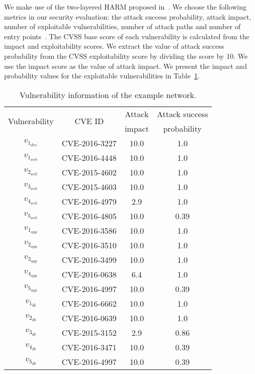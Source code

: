 \documentclass[conference]{IEEEtran}
\begin{document}
We make use of the two-layered HARM proposed in~\cite{Hong2016JNCA}. We choose the following metrics in our security evaluation: the attack success probability, attack impact, number of exploitable vulnerabilities, number of attack paths and number of entry points~\cite{Pendleton2016ComSur}. The CVSS base score of each vulnerability is calculated from the impact and exploitability scores. We extract the value of attack success probability from the CVSS exploitability score by dividing the score by 10. We use the impact score as the value of attack impact. We present the impact and probability values for the exploitable vulnerabilities in Table~\ref{tb_vuls_cve}.
\begin{table}[htb] \small
\caption{Vulnerability information of the example network.}
\label{tb_vuls_cve}
\centering
\begin{tabular}{|c|c|c|c|}
\hline
\multirow{2}{*}{Vulnerability} & \multirow{2}{*}{CVE ID} & Attack & Attack success\\
&&impact&probability\\
\hline
$v_{1_{\mathit{dns}}}$ & CVE-2016-3227 & 10.0 & 1.0 \\
\hline
$v_{1_{\mathit{web}}}$ & CVE-2016-4448 & 10.0 & 1.0\\
\hline
$v_{2_{\mathit{web}}}$ & CVE-2015-4602 & 10.0 & 1.0\\
\hline
$v_{3_{\mathit{web}}}$ & CVE-2015-4603 & 10.0 & 1.0\\
\hline
$v_{4_{\mathit{web}}}$ & CVE-2016-4979 & 2.9 & 1.0\\
\hline
$v_{5_{\mathit{web}}}$ & CVE-2016-4805 & 10.0 & 0.39\\
\hline
$v_{1_{\mathit{app}}}$ & CVE-2016-3586 & 10.0 & 1.0\\
\hline
$v_{2_{\mathit{app}}}$ & CVE-2016-3510 & 10.0 & 1.0\\
\hline
$v_{3_{\mathit{app}}}$ & CVE-2016-3499 & 10.0 & 1.0\\
\hline
$v_{4_{\mathit{app}}}$ & CVE-2016-0638 & 6.4 & 1.0\\
\hline
$v_{5_{\mathit{app}}}$ & CVE-2016-4997 & 10.0 & 0.39\\
\hline
$v_{1_{\mathit{db}}}$ & CVE-2016-6662 & 10.0 & 1.0\\
\hline
$v_{2_{\mathit{db}}}$ & CVE-2016-0639 & 10.0 & 1.0\\
\hline
$v_{3_{\mathit{db}}}$ & CVE-2015-3152 & 2.9 & 0.86\\
\hline
$v_{4_{\mathit{db}}}$ & CVE-2016-3471 & 10.0 & 0.39\\
\hline
$v_{5_{\mathit{db}}}$ & CVE-2016-4997 & 10.0 & 0.39\\
\hline
\end{tabular}
\end{table}
\end{document}
